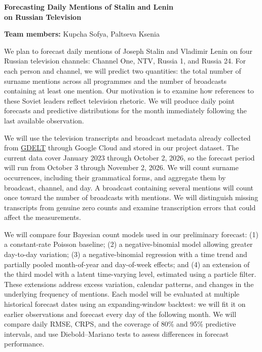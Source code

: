 \documentclass[11pt,a4paper]{article}
\begin{document}
\begin{center}
{\large\bfseries Forecasting Daily Mentions of Stalin and Lenin\\[0.15em]
on Russian Television}

\vspace{0.5em}
\textbf{Team members:} Kupcha Sofya, Paltseva Ksenia
\end{center}

We plan to forecast daily mentions of Joseph Stalin and Vladimir Lenin on four Russian television channels: Channel One, NTV, Russia 1, and Russia 24. For each person and channel, we will predict two quantities: the total number of surname mentions across all programmes and the number of broadcasts containing at least one mention. Our motivation is to examine how references to these Soviet leaders reflect television rhetoric. We will produce daily point forecasts and predictive distributions for the month immediately following the last available observation.

We will use the television transcripts and broadcast metadata already collected from \href{https://gdeltproject.org/}{GDELT} through Google Cloud and stored in our project dataset. The current data cover January 2023 through October 2, 2026, so the forecast period will run from October 3 through November 2, 2026. We will count surname occurrences, including their grammatical forms, and aggregate them by broadcast, channel, and day. A broadcast containing several mentions will count once toward the number of broadcasts with mentions. We will distinguish missing transcripts from genuine zero counts and examine transcription errors that could affect the measurements.

We will compare four Bayesian count models used in our preliminary forecast: (1) a constant-rate Poisson baseline; (2) a negative-binomial model allowing greater day-to-day variation; (3) a negative-binomial regression with a time trend and partially pooled month-of-year and day-of-week effects; and (4) an extension of the third model with a latent time-varying level, estimated using a particle filter. These extensions address excess variation, calendar patterns, and changes in the underlying frequency of mentions. Each model will be evaluated at multiple historical forecast dates using an expanding-window backtest: we will fit it on earlier observations and forecast every day of the following month. We will compare daily RMSE, CRPS, and the coverage of 80\% and 95\% predictive intervals, and use Diebold--Mariano tests to assess differences in forecast performance.
\end{document}
